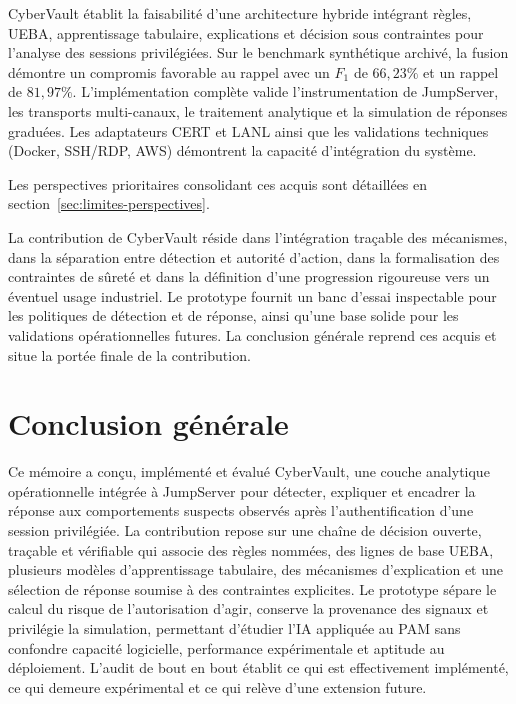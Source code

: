 \documentclass[11pt,a4paper,oneside]{report}
\theoremstyle{definition}
\theoremstyle{plain}
\begin{document}
CyberVault établit la faisabilité d'une architecture hybride intégrant règles, UEBA, apprentissage tabulaire, explications et décision sous contraintes pour l'analyse des sessions privilégiées. Sur le benchmark synthétique archivé, la fusion démontre un compromis favorable au rappel avec un \(F_1\) de $66{,}23\%$ et un rappel de $81{,}97\%$. L'implémentation complète valide l'instrumentation de JumpServer, les transports multi-canaux, le traitement analytique et la simulation de réponses graduées. Les adaptateurs CERT et LANL ainsi que les validations techniques (Docker, SSH/RDP, AWS) démontrent la capacité d'intégration du système.

Les perspectives prioritaires consolidant ces acquis sont détaillées en section~\ref{sec:limites-perspectives}.

La contribution de CyberVault réside dans l'intégration traçable des mécanismes, dans la séparation entre détection et autorité d'action, dans la formalisation des contraintes de sûreté et dans la définition d'une progression rigoureuse vers un éventuel usage industriel. Le prototype fournit un banc d'essai inspectable pour les politiques de détection et de réponse, ainsi qu'une base solide pour les validations opérationnelles futures. La conclusion générale reprend ces acquis et situe la portée finale de la contribution.


\chapter{Conclusion générale}
\label{chap:conclusion}

Ce mémoire a conçu, implémenté et évalué CyberVault, une couche analytique opérationnelle intégrée à JumpServer pour détecter, expliquer et encadrer la réponse aux comportements suspects observés après l'authentification d'une session privilégiée. La contribution repose sur une chaîne de décision ouverte, traçable et vérifiable qui associe des règles nommées, des lignes de base UEBA, plusieurs modèles d'apprentissage tabulaire, des mécanismes d'explication et une sélection de réponse soumise à des contraintes explicites. Le prototype sépare le calcul du risque de l'autorisation d'agir, conserve la provenance des signaux et privilégie la simulation, permettant d'étudier l'IA appliquée au PAM sans confondre capacité logicielle, performance expérimentale et aptitude au déploiement. L'audit de bout en bout établit ce qui est effectivement implémenté, ce qui demeure expérimental et ce qui relève d'une extension future.
\end{document}

